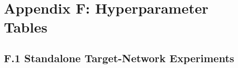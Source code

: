 
\section*{Appendix F: Hyperparameter Tables}
\label{app:hyperparameters}

\subsection*{F.1 \quad Standalone Target-Network Experiments}
\label{app:hyperparameters_standalone}

